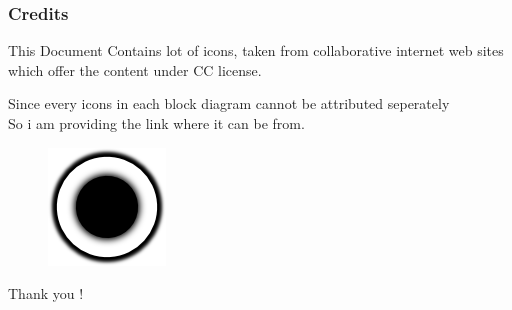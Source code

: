 \documentclass{beamer}
\begin{document}
\begin{frame}
\frametitle{Credits}
\fontsize{7.5pt}{12}\selectfont
\centering
This Document Contains lot of icons, taken from collaborative internet web sites \\ 
which offer the content under CC license. \\
\bigskip

Since every icons in each block diagram cannot be attributed seperately\\
So i am providing the link where it can be from. \\

\begin{figure}[h]
\centering
      \href{https://thenounproject.com/}{\includegraphics[width=0.2\linewidth]{./Resources/Images/urllink.png}}
\end{figure}
\end{frame}

\begin{frame}
  \fontsize{50pt}{12}\selectfont
  \begin{center}
    Thank you !
  \end{center}
\end{frame}
\end{document}
